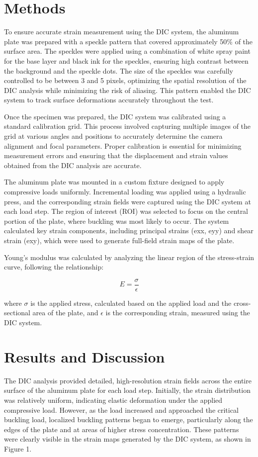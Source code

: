 \documentclass[11pt]{article}
\begin{document}
\section*{Methods}
To ensure accurate strain measurement using the DIC system, the aluminum plate was prepared with a speckle pattern that covered approximately 50\% of the surface area. The speckles were applied using a combination of white spray paint for the base layer and black ink for the speckles, ensuring high contrast between the background and the speckle dots. The size of the speckles was carefully controlled to be between 3 and 5 pixels, optimizing the spatial resolution of the DIC analysis while minimizing the risk of aliasing. This pattern enabled the DIC system to track surface deformations accurately throughout the test.

Once the specimen was prepared, the DIC system was calibrated using a standard calibration grid. This process involved capturing multiple images of the grid at various angles and positions to accurately determine the camera alignment and focal parameters. Proper calibration is essential for minimizing measurement errors and ensuring that the displacement and strain values obtained from the DIC analysis are accurate.

The aluminum plate was mounted in a custom fixture designed to apply compressive loads uniformly. Incremental loading was applied using a hydraulic press, and the corresponding strain fields were captured using the DIC system at each load step. The region of interest (ROI) was selected to focus on the central portion of the plate, where buckling was most likely to occur. The system calculated key strain components, including principal strains (exx, eyy) and shear strain (exy), which were used to generate full-field strain maps of the plate.

Young's modulus was calculated by analyzing the linear region of the stress-strain curve, following the relationship:

\begin{equation}
E = \frac{\sigma}{\epsilon}
\end{equation}

where $\sigma$ is the applied stress, calculated based on the applied load and the cross-sectional area of the plate, and $\epsilon$ is the corresponding strain, measured using the DIC system.

\section*{Results and Discussion}
The DIC analysis provided detailed, high-resolution strain fields across the entire surface of the aluminum plate for each load step. Initially, the strain distribution was relatively uniform, indicating elastic deformation under the applied compressive load. However, as the load increased and approached the critical buckling load, localized buckling patterns began to emerge, particularly along the edges of the plate and at areas of higher stress concentration. These patterns were clearly visible in the strain maps generated by the DIC system, as shown in Figure 1.
\end{document}

